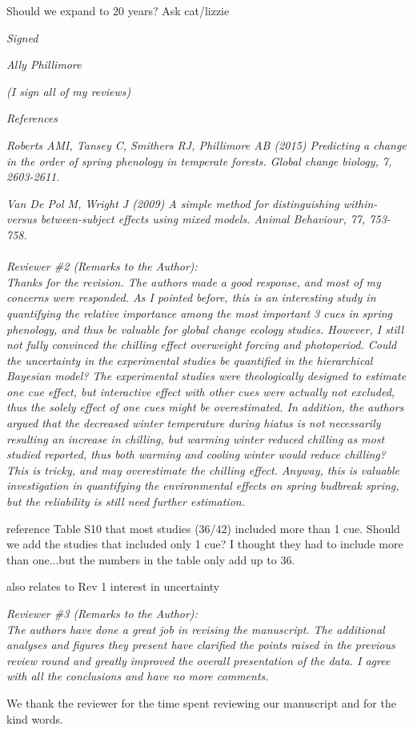\documentclass[11pt, a4paper]{article}
\begin{document}
\par Should we expand to 20 years? Ask cat/lizzie

\par \emph{Signed}
\par \emph{Ally Phillimore}
\par \emph{(I sign all of my reviews)}
\par \emph{References}
\par \emph{Roberts AMI, Tansey C, Smithers RJ, Phillimore AB (2015) Predicting a change in the order of spring
phenology in temperate forests. Global change biology, 7, 2603-2611.}
\par \emph{Van De Pol M, Wright J (2009) A simple method for distinguishing within- versus between-subject effects
using mixed models. Animal Behaviour, 77, 753-758.}
\\
\\
 \emph{Reviewer \#2 (Remarks to the Author):}\\

\emph{Thanks for the revision. The authors made a good response, and most of my concerns were responded. As I pointed before, this is an interesting study in quantifying the relative importance among the most important 3 cues in spring phenology, and thus be valuable for global change ecology studies. However, I still not fully convinced the chilling effect overweight forcing and photoperiod. Could the uncertainty in the experimental studies be quantified in the hierarchical Bayesian model? The experimental studies were theologically designed to estimate one cue effect, but interactive effect with other cues were actually not excluded, thus the solely effect of one cues might be overestimated. In addition, the authors argued that the decreased winter temperature during hiatus is not necessarily resulting an increase in chilling, but warming winter reduced chilling as most studied reported, thus both warming and cooling winter would reduce chilling? This is tricky, and may overestimate
the chilling effect. Anyway, this is valuable investigation in quantifying the environmental effects on spring budbreak spring, but the reliability is still need further estimation.
}\\

\par reference Table  S10 that most studies (36/42)  included more than 1 cue. Should we add the studies that included only 1 cue? I thought they had to include more than one...but the numbers in the table only add up to 36.
\par also relates to Rev 1 interest in uncertainty

 \emph{Reviewer \#3 (Remarks to the Author):}\\

\emph{The authors have done a great job in revising the manuscript. The additional analyses and figures they present have clarified the points raised in the previous review round and greatly improved the overall presentation of the data. I agree with all the conclusions and have no more comments.}

\par We thank the reviewer for the time spent reviewing our manuscript and for the kind words. 

\end{document}
